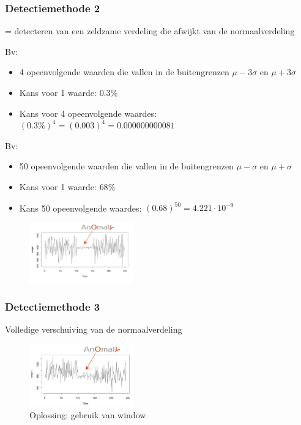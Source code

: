 \documentclass{article}
\begin{document}
\subsubsection{Detectiemethode 2}

= detecteren van een zeldzame verdeling die afwijkt van de normaalverdeling

Bv:

\begin{itemize}
    \item 4 opeenvolgende waarden die vallen in de buitengrenzen $\mu - 3\sigma$ en $\mu + 3\sigma$
    \item Kans voor 1 waarde: $0.3\%$
    \item Kans voor 4 opeenvolgende waardes: $(0.3\%)^4 = (0.003)^4 = 0.000000000081$
\end{itemize}

Bv: 

\begin{itemize}
    \item 50 opeenvolgende waarden die vallen in de buitengrenzen $\mu - \sigma$ en $\mu + \sigma$
    \item Kans voor 1 waarde: $68\%$
    \item Kans 50 opeenvolgende waardes: $(0.68)^{50} = 4.221 \cdot 10^{-9}$
\end{itemize}

\begin{figure}[H]
    \centering
    \includegraphics[width=0.4\textwidth]{anomaly-detection3.png}
    \caption{}
\end{figure}


\subsubsection{Detectiemethode 3}

Volledige verschuiving van de normaalverdeling


\begin{figure}[H]
    \centering
    \includegraphics[width=0.4\textwidth]{anomaly-detection4.png}
    \caption{Oplossing: gebruik van window}
\end{figure}
\end{document}
